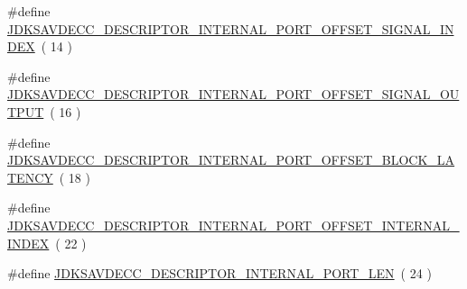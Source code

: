 \begin{DoxyCompactItemize}
\#define \hyperlink{group__descriptor__internal__port_ga2fe3309c844beb4a7960d24699a264ca}{J\+D\+K\+S\+A\+V\+D\+E\+C\+C\+\_\+\+D\+E\+S\+C\+R\+I\+P\+T\+O\+R\+\_\+\+I\+N\+T\+E\+R\+N\+A\+L\+\_\+\+P\+O\+R\+T\+\_\+\+O\+F\+F\+S\+E\+T\+\_\+\+S\+I\+G\+N\+A\+L\+\_\+\+I\+N\+D\+EX}~( 14 )
\item 
\#define \hyperlink{group__descriptor__internal__port_ga0e6929ba99344e77ec8e11703dc9b2e9}{J\+D\+K\+S\+A\+V\+D\+E\+C\+C\+\_\+\+D\+E\+S\+C\+R\+I\+P\+T\+O\+R\+\_\+\+I\+N\+T\+E\+R\+N\+A\+L\+\_\+\+P\+O\+R\+T\+\_\+\+O\+F\+F\+S\+E\+T\+\_\+\+S\+I\+G\+N\+A\+L\+\_\+\+O\+U\+T\+P\+UT}~( 16 )
\item 
\#define \hyperlink{group__descriptor__internal__port_ga6ae94a3ccca7c69be0eeade4b174485b}{J\+D\+K\+S\+A\+V\+D\+E\+C\+C\+\_\+\+D\+E\+S\+C\+R\+I\+P\+T\+O\+R\+\_\+\+I\+N\+T\+E\+R\+N\+A\+L\+\_\+\+P\+O\+R\+T\+\_\+\+O\+F\+F\+S\+E\+T\+\_\+\+B\+L\+O\+C\+K\+\_\+\+L\+A\+T\+E\+N\+CY}~( 18 )
\item 
\#define \hyperlink{group__descriptor__internal__port_ga5ddfb5a039dff9887277075c8a3a80c9}{J\+D\+K\+S\+A\+V\+D\+E\+C\+C\+\_\+\+D\+E\+S\+C\+R\+I\+P\+T\+O\+R\+\_\+\+I\+N\+T\+E\+R\+N\+A\+L\+\_\+\+P\+O\+R\+T\+\_\+\+O\+F\+F\+S\+E\+T\+\_\+\+I\+N\+T\+E\+R\+N\+A\+L\+\_\+\+I\+N\+D\+EX}~( 22 )
\item 
\#define \hyperlink{group__descriptor__internal__port_gac3707c07b819a8bace60978c44d34598}{J\+D\+K\+S\+A\+V\+D\+E\+C\+C\+\_\+\+D\+E\+S\+C\+R\+I\+P\+T\+O\+R\+\_\+\+I\+N\+T\+E\+R\+N\+A\+L\+\_\+\+P\+O\+R\+T\+\_\+\+L\+EN}~( 24 )
\end{DoxyCompactItemize}
